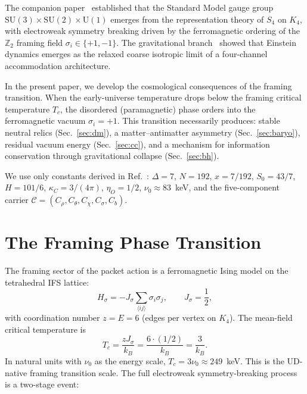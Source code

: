 \documentclass[11pt,twocolumn]{article}
\begin{document}
The companion paper~\cite{mayes2026ud} established that the Standard Model gauge group $\mathrm{SU}(3)\times\mathrm{SU}(2)\times\mathrm{U}(1)$ emerges from the representation theory of $S_4$ on $K_4$, with electroweak symmetry breaking driven by the ferromagnetic ordering of the $\mathbb{Z}_2$ framing field $\sigma_i\in\{+1,-1\}$.
The gravitational branch~\cite{mayes2026grav} showed that Einstein dynamics emerges as the relaxed coarse isotropic limit of a four-channel accommodation architecture.

In the present paper, we develop the cosmological consequences of the framing transition.
When the early-universe temperature drops below the framing critical temperature $T_c$, the disordered (paramagnetic) phase orders into the ferromagnetic vacuum $\sigma_i=+1$.
This transition necessarily produces:
stable neutral relics (Sec.~\ref{sec:dm}),
a matter--antimatter asymmetry (Sec.~\ref{sec:baryo}),
residual vacuum energy (Sec.~\ref{sec:cc}),
and a mechanism for information conservation through gravitational collapse (Sec.~\ref{sec:bh}).

We use only constants derived in Ref.~\cite{mayes2026ud}: $\Delta=7$, $N=192$, $x=7/192$, $S_0=43/7$, $H=101/6$, $\kappa_C=3/(4\pi)$, $\eta_O=1/2$, $\nu_0\approx 83$~keV, and the five-component carrier $\mathcal{C}=(C_\rho,C_\theta,C_\chi,C_\sigma,C_b)$.

\section{The Framing Phase Transition}
\label{sec:transition}

The framing sector of the packet action is a ferromagnetic Ising model on the tetrahedral IFS lattice:
\begin{equation}
H_\sigma = -J_\sigma\sum_{\langle ij\rangle}\sigma_i\sigma_j,\qquad J_\sigma = \frac{1}{2},
\label{eq:Hsigma}
\end{equation}
with coordination number $z=E=6$ (edges per vertex on $K_4$).
The mean-field critical temperature is
\begin{equation}
T_c = \frac{z J_\sigma}{k_B} = \frac{6\cdot(1/2)}{k_B} = \frac{3}{k_B}.
\label{eq:Tc}
\end{equation}
In natural units with $\nu_0$ as the energy scale, $T_c = 3\nu_0\approx 249$~keV.
This is the UD-native framing transition scale.
The full electroweak symmetry-breaking process is a two-stage event:
\end{document}
